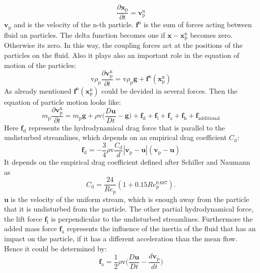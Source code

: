 \documentclass[11pt,a4paper,openany,oneside,parskip=half*]{article}
\renewcommand*\vec[1]{\boldsymbol{#1}}
\begin{document}
\begin{equation}
 \frac{\partial{\vec{x}_\mathrm{p}}}{\partial{t}} = \vec{v}_\mathrm{p}^\mathrm{n}
\end{equation}
$\vec{v}_\mathrm{p}$ and is the velocity of the n-th particle.
$\vec{f}^\mathrm{n}$ is the sum of forces acting between fluid an particles.
The delta function becomes one if $\vec{x}-\vec{x}_\mathrm{p}^\mathrm{n}$ becomes zero. Otherwise its zero. In this way, the coupling forces act at the positions of the particles on the fluid. 
Also it plays also an important role in the equation of motion of the particles:
\begin{equation}
\mathrm{v} \rho_\mathrm{p} \frac{\partial{\vec{v}_\mathrm{p}^\mathrm{n}}}{\partial{t}} = \mathrm{v} \rho_\mathrm{p}\vec{g}+\vec{f}^\mathrm{n}(\vec{x}_\mathrm{p}^\mathrm{n})
\end{equation}
As already mentioned $\vec{f}^\mathrm{n}(\vec{x}_\mathrm{p}^\mathrm{n})$ could be devided in several forces. Then the equation of particle motion looks like:
\begin{equation}
m_\mathrm{p} \frac{\partial{\vec{v}_\mathrm{p}^\mathrm{n}}}{\partial{t}} = m_\mathrm{p}\vec{g}+\rho \mathrm{v}\biggl(\frac{D\vec{u}}{Dt}-\vec{g} \biggl)+\vec{f}_\mathrm{d}+\vec{f}_\mathrm{l}+\vec{f}_\mathrm{a}+\vec{f}_\mathrm{h}+\vec{f}_\mathrm{additional}
\end{equation}
Here $\vec{f}_\mathrm{d}$ represents the hydrodynamical drag force that is parallel to the undisturbed streamlines, which depends on an empirical drag coefficient $C_{\mathrm{d}} $:
\begin{equation}
\vec{f}_\mathrm{d}=-\frac{3}{4}\rho \mathrm{v} \frac{C_\mathrm{d}}{d}|\vec{v}_\mathrm{p}-\vec{u}|(\vec{v}_\mathrm{p}-\vec{u})
\end{equation}
It depends on the empirical drag coefficient defined after Schiller and Naumann as
\begin{equation}
C_\mathrm{d} = \frac{24}{Re_\mathrm{p}}(1+0.15Re_\mathrm{p}^\mathrm{0.687}).
\end{equation}
$\vec{u}$ is the velocity of the uniform stream, which is enough away from the particle that it is undisturbed from the particle.
The other partial hydrodynamical force, the lift force $\vec{f}_\mathrm{l}$ is perpendicular to the undisturbed streamlines.
Furthermore the added mass force $\vec{f}_\mathrm{a}$ represents the influence of the inertia of the fluid that has an impact on the particle, if it has a different acceleration than the mean flow.
Hence it could be determined by:
\begin{equation}
\vec{f}_\mathrm{a} =  \frac{1}{2}\rho \mathrm{v} \biggl(\frac{D\vec{u}}{Dt}-\frac{d\vec{v}_\mathrm{p}}{dt}\biggl)
\end{equation}
\end{document}
